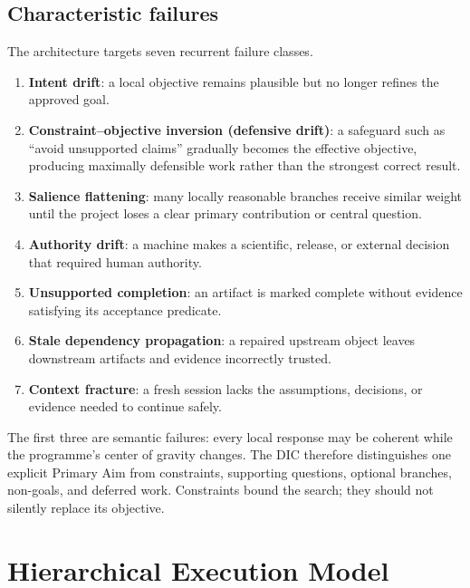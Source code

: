 \documentclass[11pt]{article}
\begin{document}
\subsection{Characteristic failures}
The architecture targets seven recurrent failure classes.
\begin{enumerate}
\item \textbf{Intent drift}: a local objective remains plausible but no longer refines the approved goal.
\item \textbf{Constraint--objective inversion (defensive drift)}: a safeguard such as ``avoid unsupported claims'' gradually becomes the effective objective, producing maximally defensible work rather than the strongest correct result.
\item \textbf{Salience flattening}: many locally reasonable branches receive similar weight until the project loses a clear primary contribution or central question.
\item \textbf{Authority drift}: a machine makes a scientific, release, or external decision that required human authority.
\item \textbf{Unsupported completion}: an artifact is marked complete without evidence satisfying its acceptance predicate.
\item \textbf{Stale dependency propagation}: a repaired upstream object leaves downstream artifacts and evidence incorrectly trusted.
\item \textbf{Context fracture}: a fresh session lacks the assumptions, decisions, or evidence needed to continue safely.
\end{enumerate}
The first three are semantic failures: every local response may be coherent while the programme's center of gravity changes. The DIC therefore distinguishes one explicit Primary Aim from constraints, supporting questions, optional branches, non-goals, and deferred work. Constraints bound the search; they should not silently replace its objective.

\section{Hierarchical Execution Model}
\end{document}
